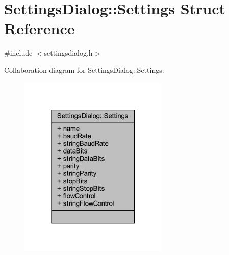\hypertarget{struct_settings_dialog_1_1_settings}{}\section{Settings\+Dialog\+::Settings Struct Reference}
\label{struct_settings_dialog_1_1_settings}


{\ttfamily \#include $<$settingsdialog.\+h$>$}



Collaboration diagram for Settings\+Dialog\+::Settings\+:
\nopagebreak
\begin{figure}[H]
\begin{center}
\leavevmode
\includegraphics[width=202pt]{struct_settings_dialog_1_1_settings__coll__graph}
\end{center}
\end{figure}
